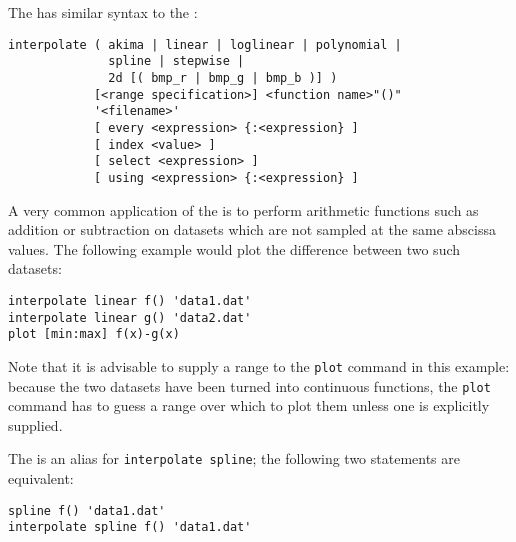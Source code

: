 The  has similar syntax to the :

\begin{verbatim}
interpolate ( akima | linear | loglinear | polynomial |
              spline | stepwise |
              2d [( bmp_r | bmp_g | bmp_b )] )
            [<range specification>] <function name>"()"
            '<filename>'
            [ every <expression> {:<expression} ]
            [ index <value> ]
            [ select <expression> ]
            [ using <expression> {:<expression} ]
\end{verbatim}

A very common application of the  is to perform arithmetic
functions such as addition or subtraction on datasets which are not sampled at
the same abscissa values. The following example would plot the difference
between two such datasets:

\begin{verbatim}
interpolate linear f() 'data1.dat'
interpolate linear g() 'data2.dat'
plot [min:max] f(x)-g(x)
\end{verbatim}

\noindent Note that it is advisable to supply a range to the {\tt plot} command
in this example: because the two datasets have been turned into continuous
functions, the {\tt plot} command has to guess a range over which to plot them
unless one is explicitly supplied.

The  is an alias for {\tt interpolate spline}; the following
two statements are equivalent:

\begin{verbatim}
spline f() 'data1.dat'
interpolate spline f() 'data1.dat'
\end{verbatim}


